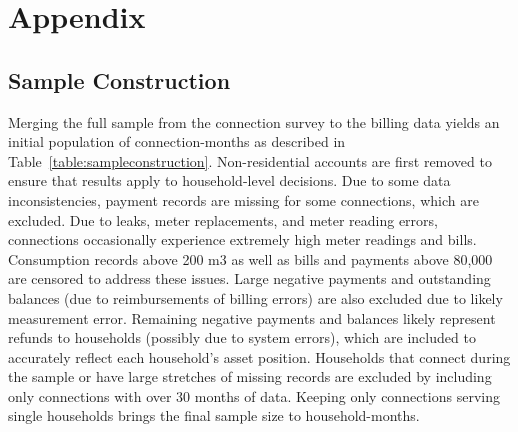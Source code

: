 \documentclass[12pt]{article}
\begin{document}










\section{Appendix}



\subsection{Sample Construction}\label{appendix:sampleconstruction}

Merging the full sample from the connection survey to the billing data yields an initial population of connection-months as described in Table~\ref{table:sampleconstruction}.  Non-residential accounts are first removed to ensure that results apply to household-level decisions.  Due to some data inconsistencies, payment records are missing for some connections, which are excluded.  Due to leaks, meter replacements, and meter reading errors, connections occasionally experience extremely high meter readings and bills.  Consumption records above 200 m3 as well as bills and payments above 80,000 are censored to address these issues.  Large negative payments and outstanding balances (due to reimbursements of billing errors) are also excluded due to likely measurement error.  Remaining negative payments and balances likely represent refunds to households (possibly due to system errors), which are included to accurately reflect each household's asset position.  Households that connect during the sample or have large stretches of missing records are excluded by including only connections with over 30 months of data.  Keeping only connections serving single households brings the final sample size to household-months.
\end{document}
